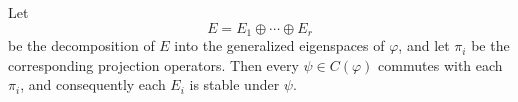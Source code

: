 Let
$$E = E_1 \oplus \cdots \oplus E_r$$
be the decomposition of $E$ into the generalized eigenspaces of $\varphi$, and let $\pi_i$ be the corresponding projection operators. Then every $\psi \in C(\varphi)$ commutes with each $\pi_i$, and consequently each $E_i$ is stable under $\psi$.

